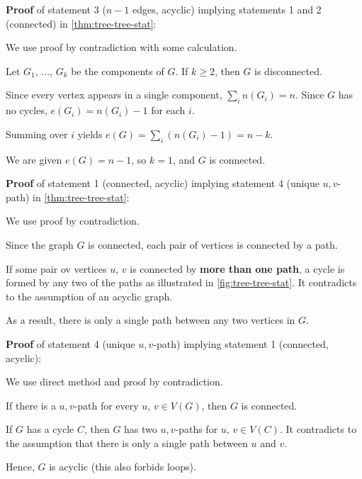 \documentclass[../src/handouts/main.tex]{subfiles}
\begin{document}
\textbf{Proof} of statement 3 ($n - 1$ edges, acyclic) implying statements 1 and 2 (connected) in \cref{thm:tree-tree-stat}:
\begin{enumerate*}
  \item We use proof by contradiction with some calculation.
  \item Let $G_1,\, \ldots,\, G_k$ be the components of $G$. If $k \geq 2$, then $G$ is disconnected.
  \item Since every vertex appears in a single component, $\sum_i n \left( G_i \right) = n$. Since $G$ has no cycles, $e \left( G_i \right) = n \left( G_i \right) - 1$ for each $i$.
  \item Summing over $i$ yields $e(G) = \sum _i \left( n \left( G_i \right) - 1 \right) = n - k$.
  \item We are given $e(G) = n - 1$, so $k = 1$, and $G$ is connected.
\end{enumerate*}
\vspace{.5em} %

\textbf{Proof} of statement 1 (connected, acyclic) implying statement 4 (unique $u,v$-path) in \cref{thm:tree-tree-stat}:
\begin{enumerate*}
  \item We use proof by contradiction.
  \item Since the graph $G$ is connected, each pair of vertices is connected by a path. 
  \item If some pair ov vertices $u,\, v$ is connected by \textbf{more than one path}, a cycle is formed by any two of the paths as illustrated in \cref{fig:tree-tree-stat}. It contradicts to the assumption of an acyclic graph.
  \item As a result, there is only a single path between any two vertices in $G$.
\end{enumerate*}
\vspace{.5em} %

\clearpage %
\textbf{Proof} of statement 4 (unique $u,v$-path) implying statement 1 (connected, acyclic):
\begin{enumerate*}
  \item We use direct method and proof by contradiction.
  \item If there is a $u,v$-path for every $u,\, v \in V(G)$, then $G$ is connected.
  \item If $G$ has a cycle $C$, then $G$ has two $u,v$-paths for $u,\, v \in V(C)$. It contradicts to the assumption that there is only a single path between $u$ and $v$.
  \item Hence, $G$ is acyclic (this also forbids loops).
\end{enumerate*}
\vspace{.5em} %
\end{document}
